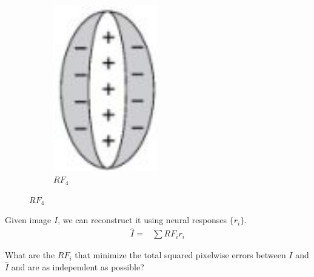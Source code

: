 \documentclass[]{article}
\begin{document}
\begin{figure}[H]
\begin{subfigure}[t]{0.2\textwidth}
	\end{subfigure}
	\begin{subfigure}[t]{0.2\textwidth}
		\caption{$RF_4$}
		\includegraphics[width=0.5\textwidth]{rf4}
	\end{subfigure}
\end{figure}

Given image $I$, we can reconstruct it using neural responses $\{r_i\}$.
\begin{align*}
	\hat{I} =& \sum RF_i r_i
\end{align*}

What are the $RF_i$ that minimize the total squared pixelwise errors between $I$ and $\hat{I}$ and are as independent as possible?
\end{document}
